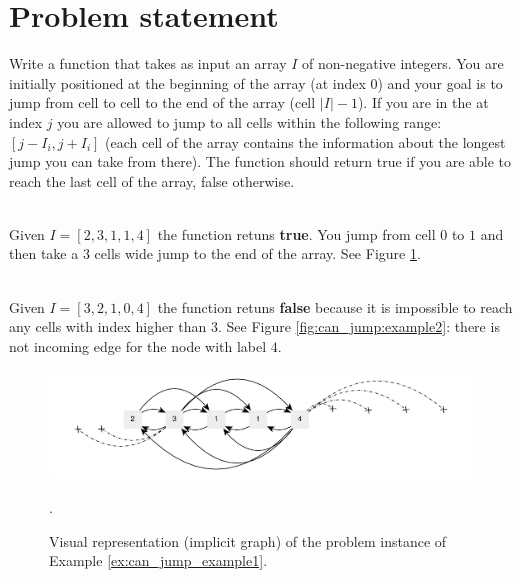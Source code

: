 \section{Problem statement}
\begin{exercise}
Write a function that takes as input  an array $I$ of non-negative integers. You are initially
positioned at the beginning of the array (at index $0$) and your goal is to jump from cell to cell
to the end of the array (cell $|I|-1$). If you are in the at index $j$ you are allowed to jump to
all cells within the following range: $[j-I_i,j+I_i]$ (each cell of the array contains the
information about the longest jump you can take from there). The function should return true if you
are able to reach the last cell of the array, false otherwise.

	\begin{example}
		\hfill \\
		Given  $I=[2,3,1,1,4]$ the function retuns \textbf{true}. You jump from cell $0$ to $1$ and
		then take a $3$ cells wide jump to the end of the array. See Figure
		\ref{fig:can_jump:example1}.
		\label{ex:can_jump_example1}
	\end{example}

	\begin{example}
		\hfill \\
		Given $I=[3,2,1,0,4]$ the function retuns \textbf{false} because it is impossible to reach
		any cells with index higher than $3$. See Figure \ref{fig:can_jump:example2}: there is not
		incoming edge for the node with label $4$.
		\label{ex:can_jump_example2}
	\end{example}
\end{exercise}

\begin{figure}
	\centering
	\includegraphics[width=\textwidth]{sources/can_jump/images/can_jump_example1}
	\caption[Implicit graph for the Example \ref{ex:can_jump_example1}.]
	{Visual representation (implicit graph) of the problem instance of Example
	\ref{ex:can_jump_example1}.}.
	\label{fig:can_jump:example1}
\end{figure}

